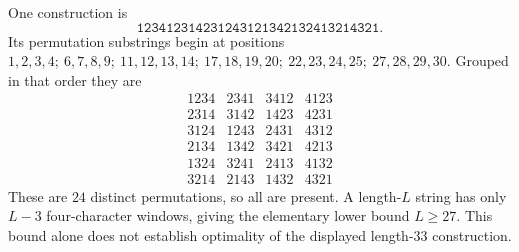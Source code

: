 One construction is
\[
\boxed{\texttt{123412314231243121342132413214321}}.
\]
Its permutation substrings begin at positions $1,2,3,4;\ 6,7,8,9;\ 11,12,13,14;\ 17,18,19,20;\ 22,23,24,25;\ 27,28,29,30$. Grouped in that order they are
\[
\begin{array}{rrrr}
1234&2341&3412&4123\\
2314&3142&1423&4231\\
3124&1243&2431&4312\\
2134&1342&3421&4213\\
1324&3241&2413&4132\\
3214&2143&1432&4321
\end{array}
\]
These are $24$ distinct permutations, so all are present. A length-$L$ string has only $L-3$ four-character windows, giving the elementary lower bound $\boxed{L\ge27}$. This bound alone does not establish optimality of the displayed length-$33$ construction.
